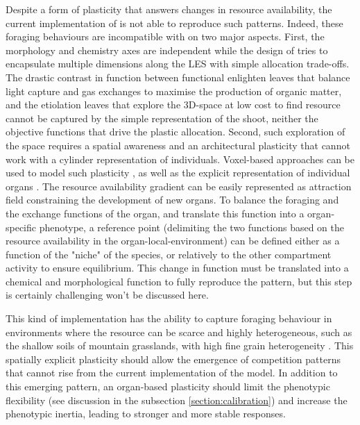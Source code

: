 Despite a form of plasticity that answers changes in resource availability, the current implementation of \model is not able to reproduce such patterns. Indeed, these foraging behaviours are incompatible with \model on two major aspects. First, the morphology and chemistry axes are independent \parencite{mitchell_intraspecific_2014} while the design of \model tries to encapsulate multiple dimensions along the LES with simple allocation trade-offs. The drastic contrast in function between functional enlighten leaves that balance light capture and gas exchanges to maximise the production of organic matter, and the etiolation leaves that explore the 3D-space at low cost to find resource cannot be captured by the simple representation of the shoot, neither the objective functions that drive the plastic allocation. Second, such exploration of the space requires a spatial awareness and an architectural plasticity that cannot work with a cylinder representation of individuals. Voxel-based approaches can be used to model such plasticity \parencite{reineking_environmental_2006}, as well as the explicit representation of individual organs \parencite{yan_dynamic_2004, vos_functionalstructural_2010}. The resource availability gradient can be easily represented as attraction field constraining the development of new organs. To balance the foraging and the exchange functions of the organ, and translate this function into a organ-specific phenotype, a reference point (delimiting the two functions based on the resource availability in the organ-local-environment) can be defined either as a function of the "niche" of the species, or relatively to the other compartment activity to ensure equilibrium. This change in function must be translated into a chemical and morphological function to fully reproduce the pattern, but this step is certainly challenging won't be discussed here.

This kind of implementation has the ability to capture foraging behaviour in environments where the resource can be scarce and highly heterogeneous, such as the shallow soils of mountain grasslands, with high fine grain heterogeneity \parencite{reineking_environmental_2006, deleglise_heterogeneite_2011}. This spatially explicit plasticity should allow the emergence of competition patterns that cannot rise from the current implementation of the model. In addition to this emerging pattern, an organ-based plasticity should limit the phenotypic flexibility (see discussion in the subsection \ref{section:calibration}) and increase the phenotypic inertia, leading to stronger and more stable responses.

